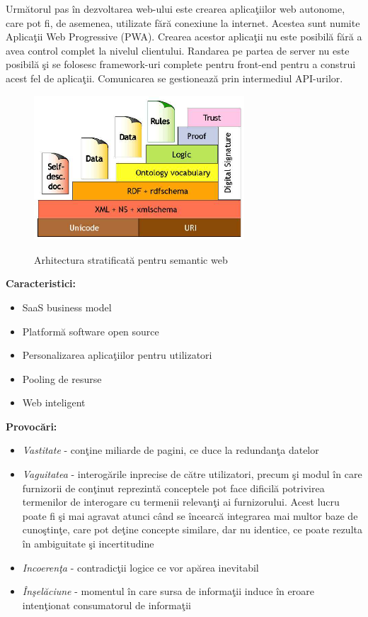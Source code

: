 \documentclass[12pt, a4paper]{report}
\begin{document}
Urm\u atorul pas \^ in dezvoltarea web-ului este crearea aplica\c tiilor web autonome, care pot fi, de asemenea, utilizate f\u ar\u a conexiune la internet. Acestea sunt numite Aplica\c tii Web Progressive (PWA). Crearea acestor aplica\c tii nu este posibil\u a f\u ar\u a a avea control complet la nivelul clientului. Randarea pe partea de server nu este posibil\u a \c si se folosesc framework-uri complete pentru front-end pentru a construi acest fel de aplica\c tii. Comunicarea se gestioneaz\u a prin intermediul API-urilor.\cite{pwa}


\begin{figure}[htbp]
	\centering
	\includegraphics[width=0.7\textwidth]{layered_architecture.png} \label{fig:layered}
	\caption{Arhitectura stratificat\u a pentru semantic web \protect\footnotemark}
\end{figure}


\textbf{Caracteristici:}
\begin{itemize}
	\item SaaS business model
	\item Platform\u a software open source
	\item Personalizarea aplica\c tiilor pentru utilizatori
	\item Pooling de resurse
	\item Web inteligent
\end{itemize}


\textbf{Provoc\u ari:}
\begin{itemize}
	\item \emph{Vastitate} - con\c tine miliarde de pagini, ce duce la redundan\c ta datelor
	\item \emph{Vaguitatea} - interog\u arile inprecise de c\u atre utilizatori, precum \c si modul \^in care furnizorii de con\c tinut reprezint\u a conceptele pot face dificil\u a potrivirea termenilor de interogare cu termenii relevan\c ti ai furnizorului. Acest lucru poate fi \c si mai agravat atunci c\^and se \^incearc\u a integrarea mai multor baze de cuno\c stin\c te, care pot de\c tine concepte similare, dar nu identice, ce poate rezulta \^in ambiguitate \c si incertitudine
	\item \emph{Incoeren\c ta} - contradic\c tii logice ce vor ap\u area inevitabil
	\item \emph{\^In\c sel\u aciune} - momentul \^in care sursa de informa\c tii induce \^in eroare inten\c tionat consumatorul de informa\c tii
\end{itemize}
\end{document}
